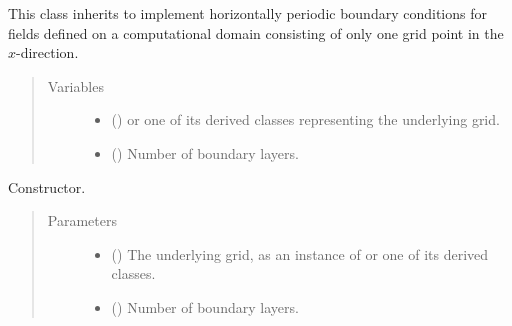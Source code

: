 \documentclass[letterpaper,10pt,english]{sphinxmanual}
\begin{document}
\begin{fulllineitems}
\label{\detokenize{api:dycore.horizontal_boundary_periodic.PeriodicYZ}}
This class inherits  to implement horizontally periodic boundary conditions for fields
defined on a computational domain consisting of only one grid point in the \(x\)-direction.
\begin{quote}\begin{description}
\item[{Variables}] \leavevmode\begin{itemize}
\item {} 
 () \textendash{}  or one of its derived classes representing the underlying grid.

\item {} 
{\hyperref[\detokenize{api:dycore.prognostic_isentropic.PrognosticIsentropic.nb}]{}} () \textendash{} Number of boundary layers.

\end{itemize}

\end{description}\end{quote}

\begin{fulllineitems}
\label{\detokenize{api:dycore.horizontal_boundary_periodic.PeriodicYZ.__init__}}
Constructor.
\begin{quote}\begin{description}
\item[{Parameters}] \leavevmode\begin{itemize}
\item {} 
 () \textendash{} The underlying grid, as an instance of {\hyperref[\detokenize{api:grids.grid_xyz.GridXYZ}]{}} or one of its derived classes.

\item {} 
 () \textendash{} Number of boundary layers.


\end{itemize}
\end{description}
\end{quote}
\end{fulllineitems}
\end{fulllineitems}
\end{document}
